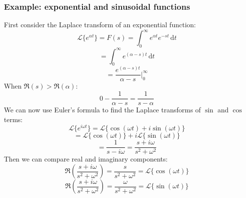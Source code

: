 \documentclass[12pt]{article}
\newcommand{\lapl}[1]{\mathcal{L}\{#1\}}
\begin{document}
\subsubsection{Example: exponential and sinusoidal functions}
First consider the Laplace transform of an exponential function:
\[\lapl{e^{\alpha t}}=F(s)=\int^\infty_0e^{\alpha t}e^{-st}\,\text{d}t\]
\[=\int^\infty_0e^{(\alpha-s)t}\,\text{d}t\]
\[=\frac{e^{(\alpha -s)t}}{\alpha-s}\bigl|^\infty_0\]
When \(\Re(s)>\Re(\alpha)\):
\[0-\frac{1}{\alpha -s}=\frac{1}{s-\alpha}\]
We can now use Euler's formula to find the Laplace transforms of \(\sin\) and \(\cos\) terms:
\[\lapl{e^{i\omega t}}=\lapl{\cos(\omega t)+i\sin(\omega t)}\]
\[=\lapl{\cos(\omega t)}+i\lapl{\sin(\omega t)}\]
\[=\frac{1}{s-i\omega}=\frac{s+i\omega}{s^2+\omega^2}\]
Then we can compare real and imaginary components:
\[\Re\left(\frac{s+i\omega}{s^2+\omega^2}\right)=\frac{s}{s^2+\omega^2}=\lapl{\cos(\omega t)}\]
\[\Re\left(\frac{s+i\omega}{s^2+\omega^2}\right)=\frac{\omega}{s^2+\omega^2}=\lapl{\sin(\omega t)}\]
\end{document}

